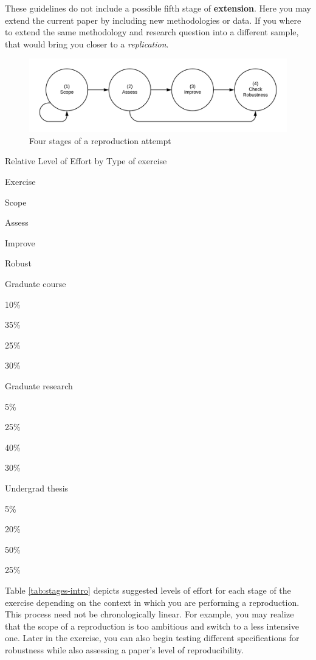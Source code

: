\documentclass[]{book}
\begin{document}
These guidelines do not include a possible fifth stage of \textbf{extension}. Here you may extend the current paper by including new methodologies or data. If you where to extend the same methodology and research question into a different sample, that would bring you closer to a \emph{replication}.

\begin{figure}
\includegraphics[width=1\linewidth]{stages} \caption{Four stages of a reproduction attempt}\label{fig:stages-intro}
\end{figure}

\label{tab:stages-intro}Relative Level of Effort by Type of exercise

Exercise

Scope

Assess

Improve

Robust

Graduate course

10\%

35\%

25\%

30\%

Graduate research

5\%

25\%

40\%

30\%

Undergrad thesis

5\%

20\%

50\%

25\%

Table \ref{tab:stages-intro} depicts suggested levels of effort for each stage of the exercise depending on the context in which you are performing a reproduction. This process need not be chronologically linear. For example, you may realize that the scope of a reproduction is too ambitious and switch to a less intensive one. Later in the exercise, you can also begin testing different specifications for robustness while also assessing a paper's level of reproducibility.
\end{document}
